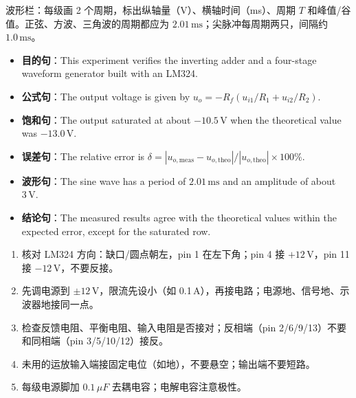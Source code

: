 \documentclass[11pt]{ctexart}
\let\orighdr\hdr
\renewcommand{\hdr}[2]{\needspace{12\baselineskip}\orighdr{#1}{#2}}
\let\origsubhdr\subhdr
\renewcommand{\subhdr}[1]{\needspace{3\baselineskip}\origsubhdr{#1}}
\begin{document}
波形栏：每级画 2 个周期，标出纵轴量（V）、横轴时间（ms）、周期 \(T\) 和峰值/谷值。正弦、方波、三角波的周期都应为 \(2.01\,\mathrm{ms}\)；尖脉冲每周期两只，间隔约 \(1.0\,\mathrm{ms}\)。


\begin{itemize}
  \item \textbf{目的句}：This experiment verifies the inverting adder and a four-stage waveform generator built with an LM324.
  \item \textbf{公式句}：The output voltage is given by \(u_o=-R_f(u_{i1}/R_1+u_{i2}/R_2)\).
  \item \textbf{饱和句}：The output saturated at about \(-10.5\,\mathrm{V}\) when the theoretical value was \(-13.0\,\mathrm{V}\).
  \item \textbf{误差句}：The relative error is \(\delta=|u_{o,\text{meas}}-u_{o,\text{theo}}|/|u_{o,\text{theo}}|\times100\%\).
  \item \textbf{波形句}：The sine wave has a period of \(2.01\,\mathrm{ms}\) and an amplitude of about \(3\,\mathrm{V}\).
  \item \textbf{结论句}：The measured results agree with the theoretical values within the expected error, except for the saturated row.
\end{itemize}



\begin{enumerate}
  \item 核对 LM324 方向：缺口/圆点朝左，pin 1 在左下角；pin 4 接 \(+12\,\mathrm{V}\)，pin 11 接 \(-12\,\mathrm{V}\)，不要反接。
  \item 先调电源到 \(\pm12\,\mathrm{V}\)，限流先设小（如 0.1\,A），再接电路；电源地、信号地、示波器地接同一点。
  \item 检查反馈电阻、平衡电阻、输入电阻是否接对；反相端（pin 2/6/9/13）不要和同相端（pin 3/5/10/12）接反。
  \item 未用的运放输入端接固定电位（如地），不要悬空；输出端不要短路。
  \item 每级电源脚加 \(0.1\,\mu F\) 去耦电容；电解电容注意极性。
\end{enumerate}

\end{document}
